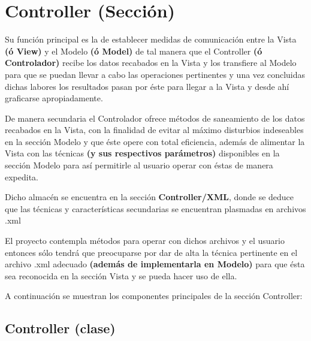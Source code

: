\documentclass[letterpaper,10pt,english]{sphinxmanual}
\begin{document}
\section{Controller (Sección)}
\label{Controller/Controller:controller-seccion}\label{Controller/Controller::doc}
Su función principal es la de establecer medidas de comunicación entre la Vista \textbf{(ó View)}
y el Modelo \textbf{(ó Model)} de tal manera que el Controller \textbf{(ó Controlador)} recibe los datos
recabados en la Vista y los transfiere al Modelo para que se puedan llevar a cabo las operaciones
pertinentes y una vez concluidas dichas labores los resultados pasan por éste para llegar a la Vista y
desde ahí graficarse apropiadamente.

De manera secundaria el Controlador ofrece métodos de saneamiento de los datos recabados en la Vista,
con la finalidad de evitar al máximo disturbios indeseables en la sección Modelo y que éste opere con total
eficiencia, además de alimentar la Vista con las técnicas \textbf{(y sus respectivos parámetros)} disponibles
en la sección Modelo para así permitirle al usuario operar con éstas de manera expedita.

Dicho almacén se encuentra en la sección \textbf{Controller/XML}, donde se deduce que las técnicas y características
secundarias se encuentran plasmadas en archivos .xml

El proyecto contempla métodos para operar con dichos archivos y el usuario entonces sólo tendrá que preocuparse
por dar de alta la técnica pertinente en el archivo .xml adecuado \textbf{(además de implementarla en Modelo)} para que
ésta sea reconocida en la sección Vista y se pueda hacer uso de ella.

A continuación se muestran los componentes principales de la sección Controller:


\subsection{Controller (clase)}
\label{Controller/ControllerClass::doc}\label{Controller/ControllerClass:module-Controller.Controller}\label{Controller/ControllerClass:controller-clase}
\end{document}
